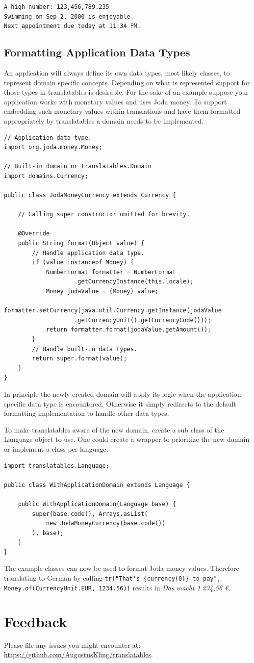\documentclass[a4paper,11pt,twoside]{report}
\begin{document}
\begin{lstlisting}
A high number: 123,456,789.235
Swimming on Sep 2, 2000 is enjoyable.
Next appointment due today at 11:34 PM.
\end{lstlisting}

\subsection{Formatting Application Data Types}
An application will always define its own data types, most likely classes, to represent domain specific concepts. Depending on what is represented support for those types in translatables is desirable. For the sake of an example suppose your application works with monetary values and uses Joda money. To support embedding such monetary values within translations and have them formatted appropriately by translatables a domain needs to be implemented.
\begin{lstlisting}
// Application data type.
import org.joda.money.Money;

// Built-in domain or translatables.Domain
import domains.Currency;

public class JodaMoneyCurrency extends Currency {

	// Calling super constructor omitted for brevity.

	@Override
	public String format(Object value) {
		// Handle application data type.
		if (value instanceof Money) {
			NumberFormat formatter = NumberFormat
					.getCurrencyInstance(this.locale);
			Money jodaValue = (Money) value;
			formatter.setCurrency(java.util.Currency.getInstance(jodaValue
					.getCurrencyUnit().getCurrencyCode()));
			return formatter.format(jodaValue.getAmount());
		}
		// Handle built-in data types.
		return super.format(value);
	}
}
\end{lstlisting}

In principle the newly created domain will apply its logic when the application specific data type is encountered. Otherwise it simply redirects to the default formatting implementation to handle other data types.

To make translatables aware of the new domain, create a sub class of the Language object to use. One could create a wrapper to prioritize the new domain or implement a class per language.
\begin{lstlisting}
import translatables.Language;

public class WithApplicationDomain extends Language {

	public WithApplicationDomain(Language base) {
		super(base.code(), Arrays.asList(
			new JodaMoneyCurrency(base.code())
		), base);
	}
}
\end{lstlisting}
The example classes can now be used to format Joda money values. Therefore translating to German by calling \lstinline$tr("That's {currency(0)} to pay", Money.of(CurrencyUnit.EUR, 1234.56))$ results in \textit{Das macht 1.234,56 €}.

\section{Feedback}
Please file any issues you might encounter at:
\newline\url{https://github.com/AugustusKling/translatables}.

\printbibliography
\end{document}
